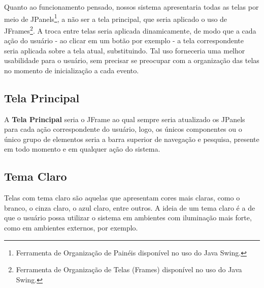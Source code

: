 \documentclass[a4paper,12pt]{article}
\begin{document}
Quanto ao funcionamento pensado, nossos sistema apresentaria todas as telas por meio de JPanels\footnote{
	Ferramenta de Organização de Painéis disponível no uso do Java Swing.
}, a não ser a tela principal, que seria aplicado o uso de JFrames\footnote{
	Ferramenta de Organização de Telas (Frames) disponível no uso do Java Swing.
}. A troca entre telas seria aplicada dinamicamente, de modo que a cada ação do usuário - ao clicar em um botão por exemplo - a 
tela correspondente seria aplicada sobre a tela atual, substituindo. Tal uso forneceria uma melhor usabilidade para o usuário, 
sem precisar se preocupar com a organização das telas no momento de inicialização a cada evento.

\subsection{Tela Principal}
A \textbf{Tela Principal} seria o JFrame ao qual sempre seria atualizado os JPanels para cada ação correspondente do usuário, logo, 
os únicos componentes ou o único grupo de elementos seria a barra superior de navegação e pesquisa, presente em todo momento e em 
qualquer ação do sistema.

\pagebreak
\subsection{Tema Claro}
Telas com tema claro são aquelas que apresentam cores mais claras, como o branco, o cinza claro, o azul claro, entre outros. 
A ideia de um tema claro é a de que o usuário possa utilizar o sistema em ambientes com iluminação mais forte, como em ambientes 
externos, por exemplo.
\end{document}
